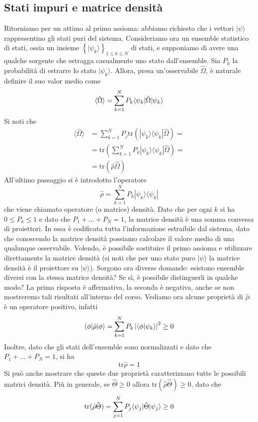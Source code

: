 \documentclass[a4paper, 11pt]{article}
\newcommand{\tr}{\mathrm{tr}}
\renewcommand{\ket}[1]{| #1\rangle}
\renewcommand{\bra}[1]{\langle #1|}
\begin{document}
\subsection{Stati impuri e matrice densità}
Ritorniamo per un attimo al primo assioma: abbiamo richiesto che i vettori $\ket{\psi}$ rappresentino gli stati puri del sistema. Consideriamo ora un ensemble statistico di stati, ossia un insieme $\left\{\ket{\psi_k}\right\}_{1\leq k\leq N}$ di stati, e supponiamo di avere una qualche sorgente che estragga casualmente uno stato dall'ensemble. Sia $P_k$ la probabilità di estrarre lo stato $\ket{\psi_k}$. Allora, presa un'osservabile $\hat{\Omega}$, è naturale definire il suo valor medio come
\[\langle\hat{\Omega}\rangle=\sum_{k=1}^{N}P_k\langle\psi_k|\hat{\Omega}|\psi_k\rangle\]
Si noti che
\begin{align*}
	\langle\hat{\Omega}\rangle&=\sum_{k=1}^{N}P_j\tr(\ket{\psi_k}\bra{\psi_k}\hat{\Omega})=\\&=\tr\left(\sum_{k=1}^{N}P_k\ket{\psi_k}\bra{\psi_k}\hat{\Omega}\right)=\\&=\tr\left(\hat{\rho}\hat\Omega\right)
\end{align*}
All'ultimo passaggio si è introdotto l'operatore
\[\hat{\rho}=\sum_{k=1}^{N}P_k\ket{\psi_k}\bra{\psi_k}\]
che viene chiamato operatore (o matrice) densità. Dato che per ogni $k$ si ha $0\leq P_k\leq1$ e dato che $P_1+\dots+P_N=1$, la matrice densità è una somma convessa di proiettori. In essa è codificata tutta l'informazione estraibile dal sistema, dato che conoscendo la matrice densità possiamo calcolare il valore medio di una qualunque osservabile. Volendo, è possibile sostituire il primo assioma e utilizzare direttamente la matrice densità (si noti che per uno stato puro $\ket{\psi}$ la matrice densità è il proiettore su $\ket{\psi}$). Sorgono ora diverse domande: esistono ensemble diversi con la stessa matrice densità? Se sì, è possibile distinguerli in qualche modo? La prima risposta è affermativa, la seconda è negativa, anche se non mostreremo tali risultati all'interno del corso. Vediamo ora alcune proprietà di $\hat{\rho}$: è un operatore positivo, infatti
\[\langle\phi|\hat{\rho}|\phi\rangle=\sum_{k=1}^{N}P_k\left|\langle \phi\vert\psi_k\rangle\right|^2\geq0\]
Inoltre, dato che gli stati dell'ensemble sono normalizzati e dato che $P_1+\dots+P_N=1$, si ha
\[\tr\hat{\rho}=1\]
Si può anche mostrare che queste due proprietà caratterizzano tutte le possibili matrici densità. Più in generale, se $\hat{\Theta}\geq0$ allora $\tr(\hat{\rho}\hat{\Theta})\geq0$, dato che
\[\tr(\hat{\rho}\hat{\Theta})=\sum_{j=1}^{N}P_j\braketop{\psi_j}{\hat{\Theta}}{\psi_j}\geq0\] 
\end{document}
